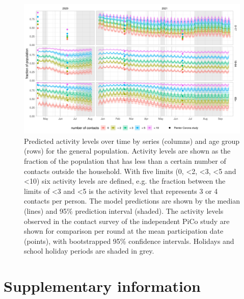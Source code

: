 \documentclass[fleqn,10pt]{wlscirep}
\begin{document}
\clearpage

\begin{figure}[ht]
\centering
\includegraphics[width=\linewidth]{../figures/prediction_generalpopulation_cat6.png}
\caption{Predicted activity levels over time by series (columns) and age group (rows) for the general population. Activity levels are shown as the fraction of the population that has less than a certain number of contacts outside the household. With five limits (0, <2, <3, <5 and <10) six activity levels are defined, e.g. the fraction between the limits of <3 and <5 is the activity level that represents 3 or 4 contacts per person. The model predictions are shown by the median (lines) and 95\% prediction interval (shaded). The activity levels observed in the contact survey of the independent PiCo study are shown for comparison per round at the mean participation date (points), with bootstrapped 95\% confidence intervals. Holidays and school holiday periods are shaded in grey.}
\label{fig:genpop}
\end{figure}

\clearpage



\section*{Supplementary information}


\renewcommand{\thefigure}{S\arabic{figure}}
\setcounter{figure}{0}
\renewcommand{\thetable}{S\arabic{table}}
\setcounter{table}{0}
\end{document}
